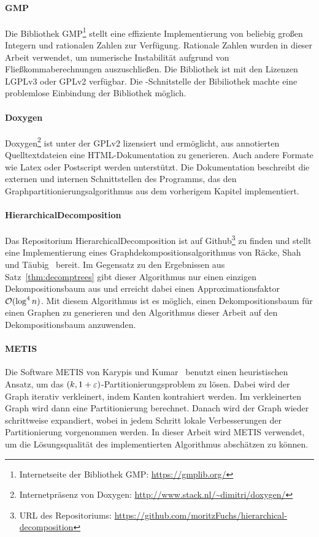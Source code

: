 \paragraph{GMP}
Die Bibliothek GMP\footnote{Internetseite der Bibliothek GMP: \url{https://gmplib.org/}} stellt eine effiziente Implementierung von beliebig großen Integern und rationalen Zahlen zur Verfügung.
Rationale Zahlen wurden in dieser Arbeit verwendet, um numerische Instabilität aufgrund von Fließkommaberechnungen auszuschließen.
Die Bibliothek ist mit den Lizenzen LGPLv3 oder GPLv2 verfügbar.
Die \Cpp\hyp Schnitstelle der Bibiliothek machte eine problemlose Einbindung der Bibliothek möglich.

\paragraph{Doxygen}
Doxygen\footnote{Internetpräsenz von Doxygen: \url{http://www.stack.nl/~dimitri/doxygen/}} ist unter der GPLv2 lizensiert und ermöglicht, aus annotierten Quelltextdateien eine HTML\hyp Dokumentation zu generieren.
Auch andere Formate wie Latex oder Postscript werden unterstützt.
Die Dokumentation beschreibt die externen und internen Schnittstellen des Programms, das den Graphpartitionierungsalgorithmus aus dem vorherigem Kapitel implementiert.

\paragraph{HierarchicalDecomposition}
Das Repositorium HierarchicalDecomposition ist auf Github\footnote{URL des Repositoriums: \url{https://github.com/moritzFuchs/hierarchical-decomposition}} zu finden und stellt eine Implementierung eines Graphdekompositionsalgorithmus von Räcke, Shah und Täubig~\parencite{RST14} bereit.
Im Gegensatz zu den Ergebnissen aus Satz~\ref{thm:decomptrees} gibt dieser Algorithmus nur einen einzigen Dekompositionsbaum aus und erreicht dabei einen Approximationsfaktor $\mathcal{O}(\log^4 n)$.
Mit diesem Algorithmus ist es möglich, einen Dekompositionsbaum für einen Graphen zu generieren und den Algorithmus dieser Arbeit auf den Dekompositionsbaum anzuwenden.

\paragraph{METIS}
Die Software METIS von Karypis und Kumar~\cite{KK98} benutzt einen heuristischen Ansatz, um das $(k, 1 + \varepsilon)$\hyp Partitionierungsproblem zu lösen. 
Dabei wird der Graph iterativ verkleinert, indem Kanten kontrahiert werden.
Im verkleinerten Graph wird dann eine Partitionierung berechnet.
Danach wird der Graph wieder schrittweise expandiert, wobei in jedem Schritt lokale Verbesserungen der Partitionierung vorgenommen werden.
In dieser Arbeit wird METIS verwendet, um die Lösungsqualität des implementierten Algorithmus abschätzen zu können.

